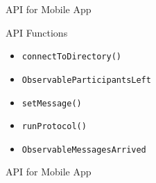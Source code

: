 \begin{frame}{API for Mobile App}
    
    \begin{block}{API Functions}
        \begin{itemize}
            \item \texttt{connectToDirectory()}
            \item \texttt{ObservableParticipantsLeft}
            \item \texttt{setMessage()}
            \item \texttt{runProtocol()}
            \item \texttt{ObservableMessagesArrived}
        \end{itemize}
    \end{block}

\end{frame}

\begin{frame}{API for Mobile App}
    \begin{columns}[c]
        \centering
        
        \centering
    
    \end{columns}
\end{frame}